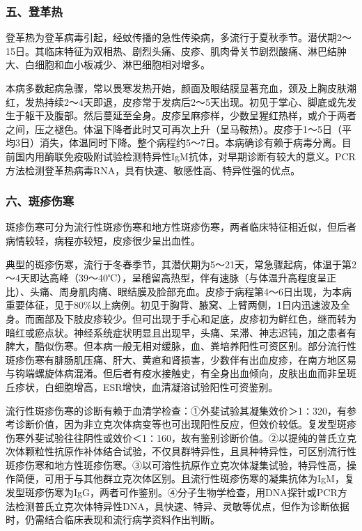 \subsubsection{五、登革热}

登革热为登革病毒引起，经蚊传播的急性传染病，多流行于夏秋季节。潜伏期2～15日。其临床特征为双相热、剧烈头痛、皮疹、肌肉骨关节剧烈酸痛、淋巴结肿大、白细胞和血小板减少、淋巴细胞相对增多。

本病多数起病急骤，常以畏寒发热开始，颜面及眼结膜显著充血，颈及上胸皮肤潮红，发热持续2～4天即退，皮疹常于发病后2～5天出现。初见于掌心、脚底或先发生于躯干及腹部。然后蔓延至全身。皮疹呈麻疹样，少数呈猩红热样，或介于两者之间，压之褪色。体温下降者此时又可再次上升（呈马鞍热）。皮疹于1～5日（平均3日）消失，体温同时下降。整个病程约5～7日。本病确诊有赖于病毒分离。目前国内用酶联免疫吸附试验检测特异性IgM抗体，对早期诊断有较大的意义。PCR方法检测登革热病毒RNA，具有快速、敏感性高、特异性强的优点。

\subsubsection{六、斑疹伤寒}

斑疹伤寒可分为流行性斑疹伤寒和地方性斑疹伤寒，两者临床特征相近似，但后者病情较轻，病程亦较短，皮疹很少呈出血性。

典型的斑疹伤寒，流行于冬春季节，其潜伏期为5～21天，常急骤起病，体温于第2～4天即达高峰（39～40℃），呈稽留高热型，伴有速脉（与体温升高程度呈正比）、头痛、周身肌肉痛、眼结膜及脸部充血。皮疹于病程第4～6日出现，为本病重要体征，见于80\%以上病例。初见于胸背、腋窝、上臂两侧，1日内迅速波及全身。而面部及下肢皮疹较少。但可出现于手心和足底，皮疹初为鲜红色，继而转为暗红或瘀点状。神经系统症状明显且出现早，头痛、呆滞、神志迟钝，加之患者有脾大，酷似伤寒。但本病一般无相对缓脉，血、粪培养阳性可资区别。部分流行性斑疹伤寒有腓肠肌压痛、肝大、黄疸和肾损害，少数伴有出血皮疹，在南方地区易与钩端螺旋体病混淆。但后者有疫水接触史，有全身出血倾向，皮肤出血而非呈斑丘疹状，白细胞增高，ESR增快，血清凝溶试验阳性可资鉴别。

流行性斑疹伤寒的诊断有赖于血清学检查：①外斐试验其凝集效价＞1∶320，有参考诊断价值，因为非立克次体病变等也可出现阳性反应，但效价较低。复发型斑疹伤寒外斐试验往往阴性或效价＜1∶160，故有鉴别诊断价值。②以提纯的普氏立克次体颗粒性抗原作补体结合试验，不仅具群特异性，且具种特异性，可区别流行性斑疹伤寒和地方性斑疹伤寒。③以可溶性抗原作立克次体凝集试验，特异性高，操作简便，可用于与其他群立克次体区别。且流行性斑疹伤寒的凝集抗体为IgM，复发型斑疹伤寒为IgG，两者可作鉴别。④分子生物学检查，用DNA探针或PCR方法检测普氏立克次体特异性DNA，具快速、特异、灵敏等优点，但作为诊断依据时，仍需结合临床表现和流行病学资料作出判断。

